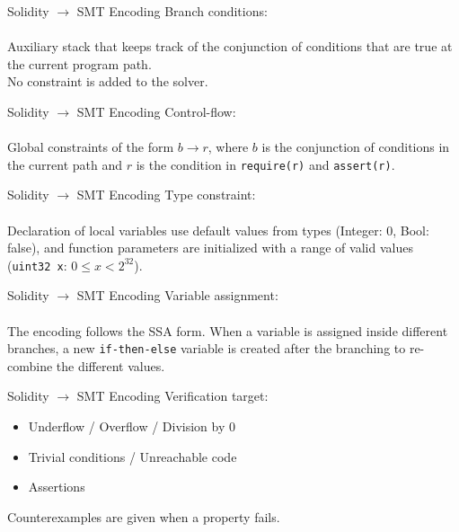 \documentclass{beamer}
\newcommand{\code}[1]{\texttt{#1}}
\begin{document}
\begin{frame}{Solidity $\rightarrow$ SMT Encoding}
Branch conditions:\\~\\
Auxiliary stack that keeps track of the conjunction of conditions that are
true at the current program path.\\
No constraint is added to the solver.
\end{frame}

\begin{frame}{Solidity $\rightarrow$ SMT Encoding}
Control-flow:\\~\\
Global constraints of the form $b \rightarrow r$, where $b$
is the conjunction of conditions in the current path and $r$ is
the condition in \code{require(r)} and \code{assert(r)}.
\end{frame}

\begin{frame}{Solidity $\rightarrow$ SMT Encoding}
Type constraint:\\~\\
Declaration of local variables use default values from types
(Integer: 0, Bool: false), and function parameters are initialized
with a range of valid values (\code{uint32 x}: $0 \le x < 2^{32}$).
\end{frame}

\begin{frame}{Solidity $\rightarrow$ SMT Encoding}
Variable assignment:\\~\\
The encoding follows the SSA form.
When a variable is assigned inside different branches,
a new \code{if-then-else} variable is created after the
branching to re-combine the different values.
\end{frame}

\begin{frame}{Solidity $\rightarrow$ SMT Encoding}
Verification target:\\
\begin{itemize}
	\item Underflow / Overflow / Division by 0 \bigskip
	\item Trivial conditions / Unreachable code \bigskip
	\item Assertions \bigskip
\end{itemize}
Counterexamples are given when a property fails.
\end{frame}
\end{document}
